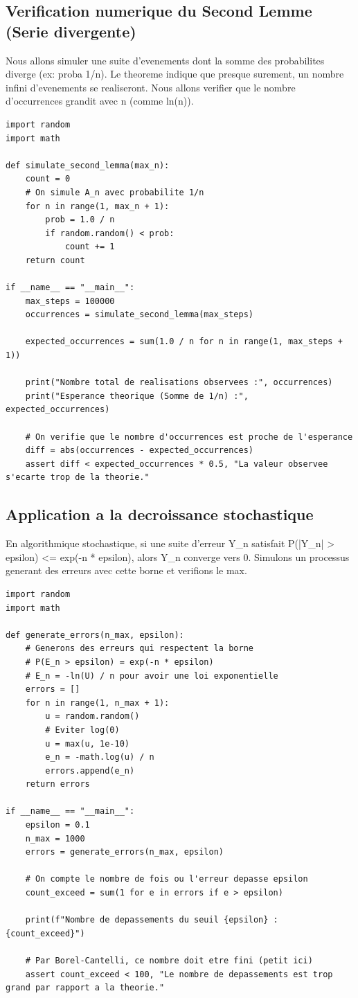 \documentclass[11pt,a4paper]{article}
\begin{document}
\subsection*{Verification numerique du Second Lemme (Serie divergente)}
Nous allons simuler une suite d'evenements dont la somme des probabilites diverge (ex: proba 1/n).
Le theoreme indique que presque surement, un nombre infini d'evenements se realiseront.
Nous allons verifier que le nombre d'occurrences grandit avec n (comme ln(n)).

\begin{lstlisting}
import random
import math

def simulate_second_lemma(max_n):
    count = 0
    # On simule A_n avec probabilite 1/n
    for n in range(1, max_n + 1):
        prob = 1.0 / n
        if random.random() < prob:
            count += 1
    return count

if __name__ == "__main__":
    max_steps = 100000
    occurrences = simulate_second_lemma(max_steps)

    expected_occurrences = sum(1.0 / n for n in range(1, max_steps + 1))

    print("Nombre total de realisations observees :", occurrences)
    print("Esperance theorique (Somme de 1/n) :", expected_occurrences)

    # On verifie que le nombre d'occurrences est proche de l'esperance
    diff = abs(occurrences - expected_occurrences)
    assert diff < expected_occurrences * 0.5, "La valeur observee s'ecarte trop de la theorie."
\end{lstlisting}


\subsection*{Application a la decroissance stochastique}
En algorithmique stochastique, si une suite d'erreur Y\_n satisfait P(|Y\_n| > epsilon) <= exp(-n * epsilon),
alors Y\_n converge vers 0. Simulons un processus generant des erreurs avec cette borne et verifions le max.

\begin{lstlisting}
import random
import math

def generate_errors(n_max, epsilon):
    # Generons des erreurs qui respectent la borne
    # P(E_n > epsilon) = exp(-n * epsilon)
    # E_n = -ln(U) / n pour avoir une loi exponentielle
    errors = []
    for n in range(1, n_max + 1):
        u = random.random()
        # Eviter log(0)
        u = max(u, 1e-10)
        e_n = -math.log(u) / n
        errors.append(e_n)
    return errors

if __name__ == "__main__":
    epsilon = 0.1
    n_max = 1000
    errors = generate_errors(n_max, epsilon)

    # On compte le nombre de fois ou l'erreur depasse epsilon
    count_exceed = sum(1 for e in errors if e > epsilon)

    print(f"Nombre de depassements du seuil {epsilon} : {count_exceed}")

    # Par Borel-Cantelli, ce nombre doit etre fini (petit ici)
    assert count_exceed < 100, "Le nombre de depassements est trop grand par rapport a la theorie."
\end{lstlisting}
\end{document}
